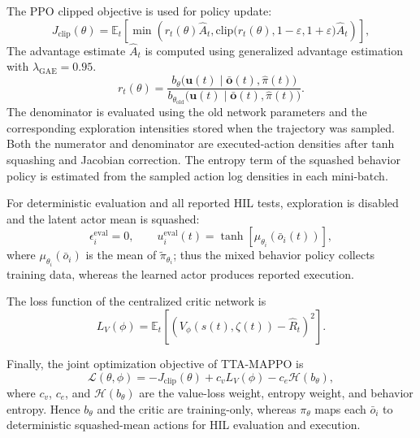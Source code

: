 \documentclass[unbranded]{cja}
\begin{document}
The PPO clipped objective is used for policy update:
\begin{equation}
J_{\mathrm{clip}}(\theta)
=
\mathbb E_t
\left[
\min
\left(
r_t(\theta)\hat A_t,
\mathrm{clip}\bigl(r_t(\theta),1-\varepsilon,1+\varepsilon\bigr)\hat A_t
\right)
\right],
\end{equation}
The advantage estimate $\hat A_t$ is computed using generalized advantage estimation with $\lambda_{\mathrm{GAE}}=0.95$.
\begin{equation}
r_t(\theta)
=
\frac{
b_{\theta}\bigl(\mathbf u(t)\mid \bar{\mathbf o}(t),\hat{\pi}(t)\bigr)
}{
b_{\theta_{\mathrm{old}}}\bigl(\mathbf u(t)\mid \bar{\mathbf o}(t),\hat{\pi}(t)\bigr)
}.
\end{equation}
The denominator is evaluated using the old network parameters and the corresponding exploration intensities stored when the trajectory was sampled. Both the numerator and denominator are executed-action densities after tanh squashing and Jacobian correction.
The entropy term of the squashed behavior policy is estimated from the sampled action log densities in each mini-batch.

For deterministic evaluation and all reported HIL tests, exploration is disabled and the latent actor mean is squashed:
\begin{equation}
\epsilon_i^{\mathrm{eval}}=0,
\qquad
u_i^{\mathrm{eval}}(t)
=
\tanh
\left[
\mu_{\theta_i}
\left(
\bar o_i(t)
\right)
\right],
\end{equation}
where $\mu_{\theta_i}(\bar o_i)$ is the mean of $\widetilde\pi_{\theta_i}$; thus the mixed behavior policy collects training data, whereas the learned actor produces reported execution.

The loss function of the centralized critic network is
\begin{equation}
L_V(\phi)
=
\mathbb E_t
\left[
\left(
V_{\phi}(s(t),\zeta(t))
-
\hat R_t
\right)^2
\right].
\end{equation}

Finally, the joint optimization objective of TTA-MAPPO is
\begin{equation}
\mathcal L(\theta,\phi)
=
-J_{\mathrm{clip}}(\theta)
+
c_v L_V(\phi)
-
c_e\mathcal H(b_{\theta}),
\end{equation}
where $c_v$, $c_e$, and $\mathcal H(b_{\theta})$ are the value-loss weight, entropy weight, and behavior entropy. Hence $b_\theta$ and the critic are training-only, whereas $\pi_\theta$ maps each $\bar o_i$ to deterministic squashed-mean actions for HIL evaluation and execution.
\end{document}

